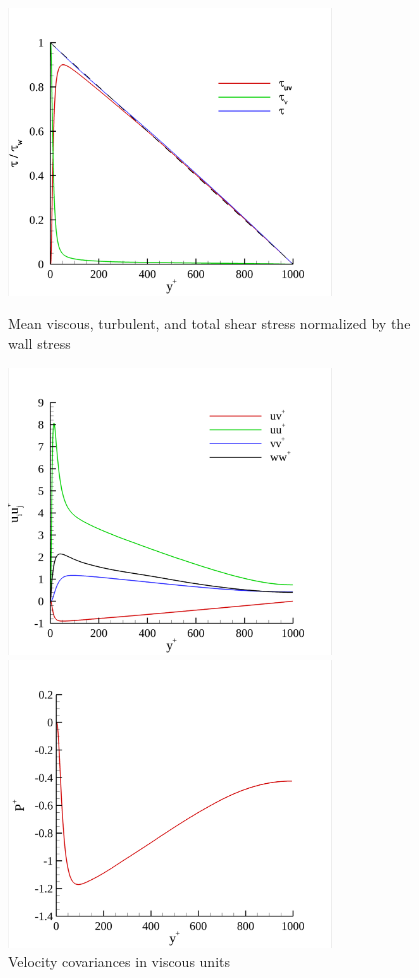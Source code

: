 \documentclass[11pt,letterpaper]{article}
\begin{document}
\begin{figure}[ht]
\centering
\begin{minipage}[b]{0.45\linewidth}
  \includegraphics[width=3.37in]{./figures/tau.png}
  \caption{Mean viscous, turbulent, and total shear stress normalized by the wall stress}
  \label{fig:tau}
\end{minipage}
\quad
\begin{minipage}[b]{0.45\linewidth}
  \includegraphics[width=3.37in]{./figures/rs.png}
  \caption{Velocity covariances in viscous units}
  \label{fig:rs}
\end{minipage}
\quad
\begin{minipage}[b]{0.45\linewidth}
  \includegraphics[width=3.37in]{./figures/p.png}

\end{minipage}
\end{figure}
\end{document}
